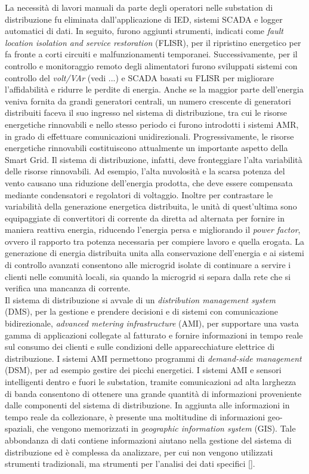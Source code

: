 La necessità di lavori manuali da parte degli operatori nelle substation di distribuzione fu eliminata dall'applicazione di IED, sistemi SCADA e logger automatici di dati. In seguito, furono aggiunti strumenti, indicati come \emph{fault location isolation and service restoration} (FLISR), per il ripristino energetico per fa fronte a corti circuiti e malfunzionamenti temporanei. Successivamente,  per il controllo e monitoraggio remoto degli alimentatori furono sviluppati sistemi con controllo del \emph{volt/VAr} (vedi ...) e SCADA basati su FLISR per migliorare l'affidabilità e ridurre le perdite di energia. Anche se la maggior parte dell'energia veniva fornita da grandi generatori centrali, un numero crescente di generatori distribuiti faceva il suo ingresso nel sistema di distribuzione, tra cui le risorse energetiche rinnovabili e nello stesso periodo ci furono introdotti i sistemi AMR, in grado di effettuare comunicazioni unidirezionali. Progressivamente, le risorse energetiche rinnovabili costituiscono attualmente un importante aspetto della Smart Grid. Il sistema di distribuzione, infatti, deve fronteggiare l'alta variabilità delle risorse rinnovabili. Ad esempio, l'alta nuvolosità e la scarsa potenza del vento causano una riduzione dell'energia prodotta, che deve essere compensata mediante condensatori e regolatori di voltaggio. Inoltre per contrastare le variabilità della generazione energetica distribuita, le unità di quest'ultima sono equipaggiate di convertitori di corrente da diretta ad alternata per fornire in maniera reattiva energia, riducendo l'energia persa e migliorando il \emph{power factor}, ovvero il rapporto tra potenza necessaria per compiere lavoro e quella erogata. La generazione di energia distribuita unita alla conservazione dell'energia e ai sistemi di controllo avanzati consentono alle microgrid isolate di continuare a servire i clienti nelle comunità locali, sia quando la microgrid si separa dalla rete che si verifica una mancanza di corrente. 
\\ 
Il sistema di distribuzione si avvale di un \emph{distribution management system} (DMS), per la gestione e prendere decisioni e di sistemi con comunicazione bidirezionale, \emph{advanced metering infrastructure} (AMI), per supportare una vasta gamma di applicazioni collegate al fatturato e fornire informazioni in tempo reale sul consumo dei clienti e sulle condizioni delle apparecchiature elettrice di distribuzione. I sistemi AMI permettono programmi di \emph{demand-side management} (DSM), per ad esempio gestire dei picchi energetici. I sistemi AMI e sensori intelligenti dentro e fuori le substation, tramite comunicazioni ad alta larghezza di banda consentono di ottenere una grande quantità di informazioni proveniente dalle componenti del sistema di distribuzione. In aggiunta alle informazioni in tempo reale da collezionare, è presente una moltitudine di informazioni geo-spaziali, che vengono memorizzati in \emph{geographic information system} (GIS). Tale abbondanza di dati contiene informazioni aiutano nella gestione del sistema di distribuzione ed è complessa da analizzare, per cui non vengono utilizzati strumenti tradizionali, ma strumenti per l'analisi dei dati specifici [].    
 
